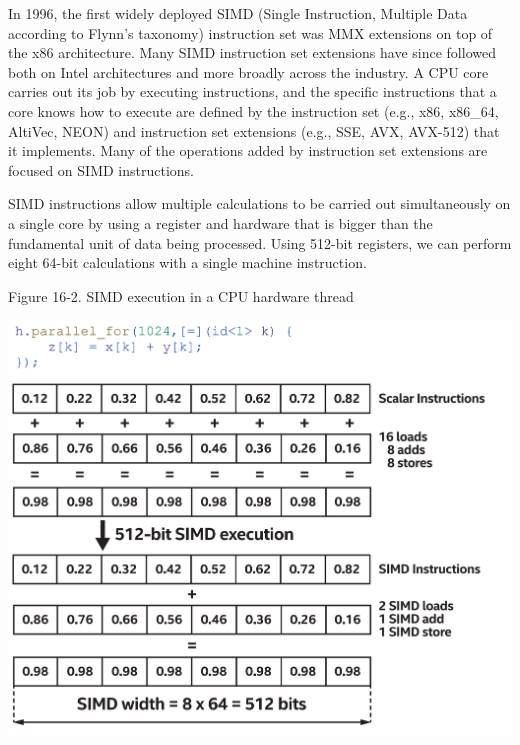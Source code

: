 In 1996, the first widely deployed SIMD (Single Instruction, Multiple Data according to Flynn’s taxonomy) instruction set was MMX extensions on top of the x86 architecture. Many SIMD instruction set extensions have since followed both on Intel architectures and more broadly across the industry. A CPU core carries out its job by executing instructions, and the specific instructions that a core knows how to execute are defined by the instruction set (e.g., x86, x86\_64, AltiVec, NEON) and instruction set extensions (e.g., SSE, AVX, AVX-512) that it implements. Many of the operations added by instruction set extensions are focused on SIMD instructions.\par

SIMD instructions allow multiple calculations to be carried out simultaneously on a single core by using a register and hardware that is bigger than the fundamental unit of data being processed. Using 512-bit registers, we can perform eight 64-bit calculations with a single machine instruction.\par

\hspace*{\fill} \par %
Figure 16-2. SIMD execution in a CPU hardware thread
\begin{center}
	\includegraphics[width=1.0\textwidth]{content/chapter-16/images/3}
\end{center}

